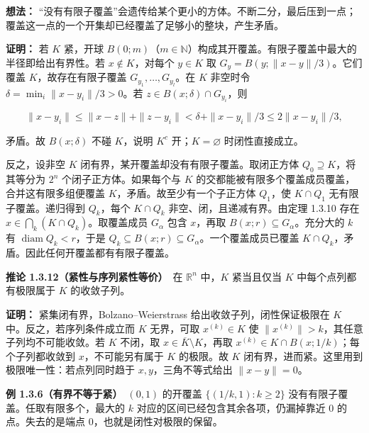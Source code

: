 \documentclass[11pt,a4paper]{article}
\begin{document}
\textbf{想法：}
``没有有限子覆盖''会遗传给某个更小的方体。不断二分，最后压到一点；覆盖这一点的一个开集却已经覆盖了足够小的整块，产生矛盾。

\textbf{证明：} 若 \(K\) 紧，开球
\(B(0;m)\)（\(m\in\mathbb N\)）构成其开覆盖。有限子覆盖中最大的半径即给出有界性。若
\(x\notin K\)，对每个 \(y\in K\) 取 \(G_y=B(y;\|x-y\|/3)\)。它们覆盖
\(K\)，故存在有限子覆盖 \(G_{y_1},\ldots,G_{y_l}\)。在 \(K\) 非空时令
\(\delta=\min_i\|x-y_i\|/3>0\)。若 \(z\in B(x;\delta)\cap G_{y_i}\)，则

\begin{equation*}
\|x-y_i\|\leq\|x-z\|+\|z-y_i\|<\delta+\|x-y_i\|/3\leq2\|x-y_i\|/3,
\end{equation*}

矛盾。故 \(B(x;\delta)\) 不碰 \(K\)，说明 \(K^c\) 开；\(K=\varnothing\)
时闭性直接成立。

反之，设非空 \(K\) 闭有界，某开覆盖却没有有限子覆盖。取闭正方体
\(Q_0\supseteq K\)，将其等分为 \(2^n\) 个闭子正方体。如果每个与 \(K\)
的交都能被有限多个覆盖成员覆盖，合并这有限多组便覆盖
\(K\)，矛盾。故至少有一个子正方体 \(Q_1\)，使 \(K\cap Q_1\)
无有限子覆盖。递归得到 \(Q_k\)，每个 \(K\cap Q_k\)
非空、闭，且递减有界。由定理 1.3.10 存在
\(x\in\bigcap_k(K\cap Q_k)\)。取覆盖成员 \(G_\alpha\) 包含 \(x\)，再取
\(B(x;r)\subseteq G_\alpha\)。充分大的 \(k\) 有
\(\operatorname{diam}Q_k<r\)，于是
\(Q_k\subseteq B(x;r)\subseteq G_\alpha\)。一个覆盖成员已覆盖
\(K\cap Q_k\)，矛盾。因此任何开覆盖都有有限子覆盖。

\textbf{推论 1.3.12（紧性与序列紧性等价）}　在 \(\mathbb R^n\) 中，\(K\)
紧当且仅当 \(K\) 中每个点列都有极限属于 \(K\) 的收敛子列。

\textbf{证明：} 紧集闭有界，Bolzano--Weierstrass
给出收敛子列，闭性保证极限在 \(K\) 中。反之，若序列条件成立而 \(K\)
无界，可取 \(x^{(k)}\in K\) 使
\(\|x^{(k)}\|>k\)，其任意子列均不可能收敛。若 \(K\) 不闭，取
\(x\in\overline K\setminus K\)，再取
\(x^{(k)}\in K\cap B(x;1/k)\)；每个子列都收敛到 \(x\)，不可能另有属于
\(K\) 的极限。故 \(K\)
闭有界，进而紧。这里用到极限唯一性：若点列同时趋于
\(x,y\)，三角不等式给出 \(\|x-y\|=0\)。

\textbf{例 1.3.6（有界不等于紧）}　\((0,1)\) 的开覆盖
\(\{(1/k,1):k\geq2\}\) 没有有限子覆盖。任取有限多个，最大的 \(k\)
对应的区间已经包含其余各项，仍漏掉靠近 \(0\) 的点。失去的是端点
\(0\)，也就是闭性对极限的保留。

\end{document}
